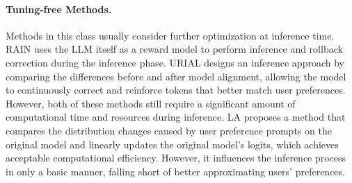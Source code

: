 \paragraph{\textbf{Tuning-free Methods.}}
Methods in this class usually consider further optimization at inference time. RAIN \citep{li2023rain} uses the LLM itself as a reward model to perform inference and rollback correction during the inference phase. URIAL \citep{lin2023unlocking} designs an inference approach by comparing the differences before and after model alignment, allowing the model to continuously correct and reinforce tokens that better match user preferences. However, both of these methods still require a significant amount of computational time and resources during inference. LA \citep{gao2024linear} proposes a method that compares the distribution changes caused by user preference prompts on the original model and linearly updates the original model's logits, which achieves acceptable computational efficiency. However, it influences the inference process in only a basic manner, falling short of better approximating users' preferences. 

\vspace{-1.5ex}